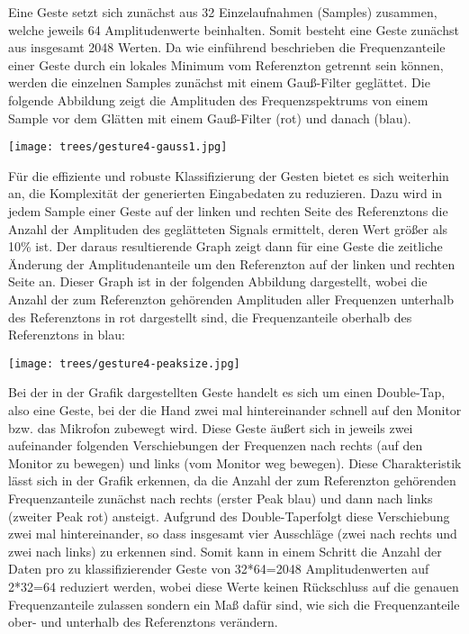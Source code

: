 Eine Geste setzt sich zunächst aus 32 Einzelaufnahmen (Samples) zusammen, welche jeweils 
64 Amplitudenwerte beinhalten. Somit besteht eine Geste zunächst aus insgesamt 2048 Werten.
Da wie einführend beschrieben die Frequenzanteile einer Geste durch ein lokales Minimum vom Referenzton 
getrennt sein können, werden die einzelnen Samples zunächst mit einem Gauß-Filter geglättet. 
Die folgende Abbildung zeigt die Amplituden des Frequenzspektrums von einem Sample 
vor dem Glätten mit einem Gauß-Filter (rot) und danach (blau).

\begin{center}
  \texttt{[image: trees/gesture4-gauss1.jpg]}
\end{center}

Für die effiziente und robuste Klassifizierung der Gesten bietet es sich weiterhin an, 
die Komplexität der generierten Eingabedaten zu reduzieren. Dazu wird in jedem Sample einer Geste 
auf der linken und rechten Seite des Referenztons die Anzahl der Amplituden des geglätteten Signals ermittelt, 
deren Wert größer als 10\% ist. Der daraus resultierende Graph zeigt dann für eine Geste die zeitliche 
Änderung der Amplitudenanteile um den Referenzton auf der linken und rechten Seite an. Dieser Graph ist in der folgenden 
Abbildung dargestellt, wobei die Anzahl der zum Referenzton gehörenden Amplituden aller Frequenzen unterhalb des
Referenztons in rot dargestellt sind, die Frequenzanteile oberhalb des Referenztons in blau:

\begin{center}
  \texttt{[image: trees/gesture4-peaksize.jpg]}
\end{center}

Bei der in der Grafik dargestellten Geste handelt es sich um einen \glqq Double-Tap\grqq , also eine Geste, bei der die Hand zwei mal 
hintereinander schnell auf den Monitor bzw. das Mikrofon zubewegt wird. Diese Geste äußert sich in jeweils zwei aufeinander folgenden 
Verschiebungen der Frequenzen nach rechts (auf den Monitor zu bewegen) und links (vom Monitor weg bewegen). 
Diese Charakteristik lässt sich in der Grafik erkennen, da die Anzahl der zum Referenzton gehörenden Frequenzanteile zunächst nach rechts (erster Peak blau) und dann nach links (zweiter Peak rot) ansteigt. Aufgrund des \glqq Double-Tap\grqq  erfolgt diese 
Verschiebung zwei mal hintereinander, so dass insgesamt vier Ausschläge (zwei nach rechts und zwei nach links) zu erkennen sind. 
Somit kann in einem Schritt die Anzahl der Daten pro zu klassifizierender Geste von 32*64=2048 Amplitudenwerten 
auf 2*32=64 reduziert werden, wobei diese Werte keinen Rückschluss auf die genauen Frequenzanteile zulassen sondern 
ein Maß dafür sind, wie sich die Frequenzanteile ober- und unterhalb des Referenztons verändern.


